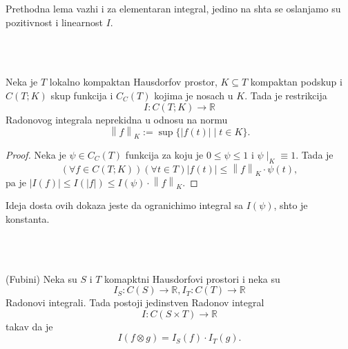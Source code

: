 \documentclass[a4paper,12pt]{article}
\newcommand{\RR}{\mathbb{R}}
\newcommand{\psj}{\subseteq}
\newcommand{\norm}[1]{\left\lVert#1\right\rVert}
\begin{document}
\begin{nap}
	Prethodna lema vazhi i za elementaran integral, jedino na shta se oslanjamo su pozitivnost i linearnost $I$.
\end{nap}
\\ \\
\begin{tvr}
	Neka je $T$ lokalno kompaktan Hausdorfov prostor, $K \psj T$ kompaktan podskup i $C(T; K)$ skup funkcija i $C_C(T)$
	kojima je nosach u $K$. Tada je restrikcija
	\[ I:C(T;K) \to \RR \] 
	Radonovog integrala neprekidna u odnosu na normu
	\[ \norm{f}_K := \sup\{|f(t)| \mid t\in K\} .\] 
\end{tvr}
\begin{proof}
	Neka je $\psi \in  C_C(T)$ funkcija za koju je $0 \leq \psi \leq 1$ i $\psi \mid_{K} \equiv 1$. Tada je 
	\[ (\forall f \in C(T; K))(\forall t \in T) |f(t)| \leq \norm{f}_K \cdot \psi(t) ,\] 
	pa je $|I(f)| \leq I(|f|) \leq I(\psi) \cdot \norm{f}_K$.
\end{proof}

\begin{nap}
	Ideja dosta ovih dokaza jeste da ogranichimo integral sa $I(\psi)$, shto je konstanta.
\end{nap}
\\ \\
\begin{tma}(Fubini)
	Neka su $S$ i $T$ komapktni Hausdorfovi prostori i neka su 
	\[ I_S : C(S) \to \RR ,  I_T : C(T) \to \RR\] 
	Radonovi integrali. Tada postoji jedinstven Radonov integral 
	\[ I:C(S\times T) \to \RR \] 
	takav da je 
	\[ I(f\otimes g) = I_S(f)\cdot I_T(g) .\] 
\end{tma}
\end{document}
